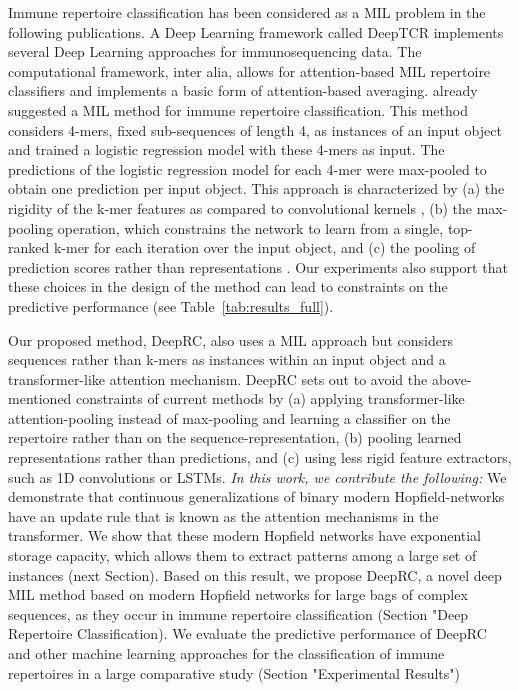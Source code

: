 \documentclass[oneside]{book}
\begin{document}
Immune repertoire classification has been considered
as a MIL problem in the following publications.
A Deep Learning framework called DeepTCR \citep{sidhom2019deeptcr}
implements several Deep Learning approaches for immunosequencing data. 
The computational framework, inter alia,
allows for attention-based MIL repertoire classifiers 
and implements a basic form of attention-based averaging.
\citet{ostmeyer2019biophysicochemical} already suggested a MIL method for 
immune repertoire classification. This method considers 4-mers, 
fixed sub-sequences 
of length 4, as instances of an input object and trained a logistic 
regression model with these 4-mers as input. 
The predictions of the logistic regression model for each 4-mer were max-pooled to
obtain one prediction per input object.
This approach is characterized by  
(a) the rigidity of the k-mer features as compared to convolutional 
kernels \citep{alipanahi2015predicting, zhou2015predicting, zeng2016convolutional}, 
(b) the max-pooling operation, which constrains the network to learn from a 
single, top-ranked k-mer for each iteration over the input object, and
(c) the pooling of prediction scores rather than representations \citep{wang2018revisiting}.
Our experiments also support that these 
choices in the design of the method can lead to constraints on the 
predictive performance (see Table~\ref{tab:results_full}). 

Our proposed method, DeepRC, also uses a MIL approach
but considers sequences rather than k-mers as instances within an input object
and a transformer-like attention mechanism.
DeepRC sets out to avoid the above-mentioned constraints of current methods by
(a) applying transformer-like attention-pooling instead of max-pooling and 
learning a classifier on the repertoire rather 
than on the sequence-representation,
(b) pooling learned representations rather than predictions, and
(c) using less rigid feature extractors,
such as 1D convolutions or LSTMs.
%
\emph{In this work, we contribute the following:}
We demonstrate that continuous generalizations of binary 
modern Hopfield-networks \citep{Krotov:16, Krotov:18, Demircigil:17} 
have an update rule that is known as the attention mechanisms
in the transformer. We show that these modern Hopfield networks have exponential storage
capacity, which allows them to extract patterns among a large set of instances (next Section). %
Based on this result, 
we propose DeepRC, 
a novel deep MIL method based on 
modern Hopfield networks for large bags
of complex sequences,
as they occur in immune repertoire classification (Section "Deep Repertoire Classification). %
We evaluate the predictive performance of DeepRC and other machine learning approaches for the 
classification of immune repertoires in a large comparative study (Section "Experimental Results")%
%
\end{document}
